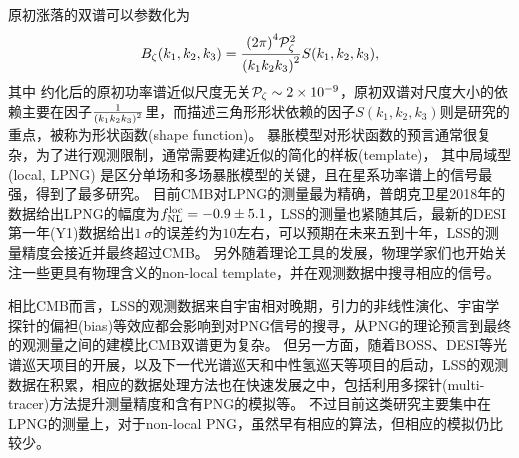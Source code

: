 原初涨落的双谱可以参数化为
\begin{equation}
    B_{\zeta}(k_1,k_2,k_3) = \frac{{(2\pi)}^4 \mathcal{P}_{\zeta}^2}{{\qty(k_1 k_2 k_3)}^2}  S(k_1,k_2,k_3),
\end{equation}
其中
约化后的原初功率谱近似尺度无关$\mathcal{P}_{\zeta}\sim 2\times 10^{-9}$，原初双谱对尺度大小的依赖主要在因子$\frac{1}{{\qty(k_1 k_2 k_3)}^2}$里，而描述三角形形状依赖的因子$S(k_1,k_2,k_3)$则是研究的重点，被称为形状函数(shape function)。
暴胀模型对形状函数的预言通常很复杂，为了进行观测限制，通常需要构建近似的简化的样板(template)，%
其中局域型(local, LPNG)%
是区分单场和多场暴胀模型的关键，且在星系功率谱上的信号最强，得到了最多研究。
目前CMB对LPNG的测量最为精确，普朗克卫星2018年的数据给出LPNG的幅度为$f_{\rm NL}^{\rm loc}=-0.9\pm 5.1$\cite{planck2020png}，LSS的测量也紧随其后，最新的DESI第一年(Y1)数据给出$1~\sigma$的误差约为$10$左右\cite{chaussidon2024desipng}，可以预期在未来五到十年，LSS的测量精度会接近并最终超过CMB\cite{achucarro2022inflation,zhao2024must}。
另外随着理论工具的发展，物理学家们也开始关注一些更具有物理含义的non-local template，并在观测数据中搜寻相应的信号\cite{sohn2024CCCMB,cabass2024boss,green2024boss}。

相比CMB而言，LSS的观测数据来自宇宙相对晚期，引力的非线性演化、宇宙学探针的偏袒(bias)等效应都会影响到对PNG信号的搜寻，从PNG的理论预言到最终的观测量之间的建模比CMB双谱更为复杂。
但另一方面，随着BOSS、DESI等光谱巡天项目的开展，以及下一代光谱巡天和中性氢巡天等项目的启动，LSS的观测数据在积累，相应的数据处理方法也在快速发展之中，包括利用多探针(multi-tracer)方法提升测量精度\cite{barreira2023mtpng,sullivan2023mtpng}和含有PNG的模拟\cite{coulton2022quijotepng,adame2024unitpng,hadzhiyska2024abacuspng}等。
不过目前这类研究主要集中在LPNG的测量上，对于non-local PNG，虽然早有相应的算法\cite{scoccimarro2012nonlocalpng,wagner2010pshmf,regan2012uningic}，但相应的模拟\cite{coulton2022quijotepng,goldstein2024quijotecc}仍比较少。

